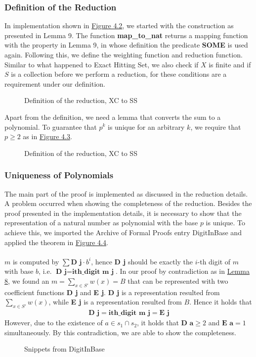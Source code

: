 \subsubsection{Definition of the Reduction}
In implementation shown in \hyperref[fig:4.2]{Figure 4.2}, we started with the construction as presented in Lemma 9. The function \textbf{map\_to\_nat} returns 
a mapping function with the property in Lemma 9, in whose definition the predicate \textbf{SOME} is used again.
Following this, we define the weighting function and reduction function. 
Similar to what happened to Exact Hitting Set, we also check if $X$ is finite and if $S$ is 
a collection before we perform a reduction, for these conditions are a requirement under our definition. 
\begin{figure}[!h]
    \caption{Definition of the reduction, XC to SS}
    \label{fig:4.2}
\end{figure}
Apart from the definition, we need a lemma that converts the sum to a polynomial. To guarantee that $p^k$ is unique for an arbitrary $k$, 
we require that $p \geq 2$ as in \hyperref[fig:4.3]{Figure 4.3}.
\begin{figure}[!h]
    \caption{Definition of the reduction, XC to SS}
    \label{fig:4.3}
\end{figure}

\subsubsection{Uniqueness of Polynomials}
The main part of the proof is implemented as discussed in the reduction details. A problem occurred when showing the completeness of the reduction. 
Besides the proof presented in the implementation details, it is necessary to show that the representation of a natural number as
polynomial with the base $p$ is unique. To achieve this, we imported the Archive of Formal Proofs entry DigitInBase and applied the theorem 
in \hyperref[fig:4.4]{Figure 4.4}.\\\\
$m$ is computed by $\sum \textbf{D j} \cdot b^i$, hence \textbf{D j} should be exactly the $i$-th 
digit of $m$ with base $b$, i.e. $\textbf{D j} = \textbf{ith\_digit m j}$. 
In our proof by contradiction as in \hyperref[lemma:sscompl]{Lemma 8}, 
we found an $m = \sum_{x \in S'} w(x) = B$ that can be represented with two coefficient functions \textbf{D j} and \textbf{E j}. 
\textbf{D j} is a representation resulted from $\sum_{x \in S'} w(x)$, 
while \textbf{E j} is a representation resulted from $B$.
Hence it holds that 
\begin{align*}
    \textbf{D j} = \textbf{ith\_digit m j} = \textbf{E j}
\end{align*}
However, due to the existence of $a \in s_1 \cap s_2$, it holds that $\textbf{D a} \geq 2$ and $\textbf{E a} = 1$ simultaneously. 
By this contradiction, we are able to show the completeness.
\begin{figure}[!h]
    \caption{Snippets from DigitInBase}
    \label{fig:4.4}
\end{figure}
